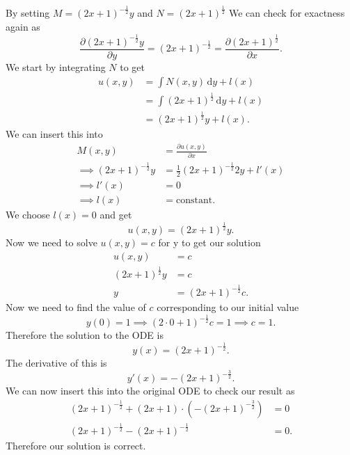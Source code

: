 By setting $M = \left( 2x+1 \right)^{-\frac{1}{2}}y$ and $N = \left( 2x+1 \right)^{\frac{1}{2}}$
We can check for exactness again as
\[ 
\frac{\partial (2x+1)^{-\frac{1}{2}}y}{\partial y} = (2x+1)^{-\frac{1}{2}} = \frac{\partial \left( 2x+1 \right)^{\frac{1}{2}}}{\partial x}
.\]
We start by integrating $N$ to get
\begin{align*}
  u(x,y) &= \int N(x,y) \, \mathrm{d}y + l(x) \\
  &= \int \left( 2x+1 \right)^{\frac{1}{2}} \, \mathrm{d}y + l(x) \\
  &= \left( 2x+1 \right)^{\frac{1}{2}}y + l(x)
.\end{align*}
We can insert this into
\begin{align*}
  M(x,y) &= \frac{\partial u(x,y)}{\partial x} \\
  \implies \left( 2x+1 \right)^{-\frac{1}{2}}y &= \frac{1}{2} \left( 2x+1 \right)^{-\frac{1}{2}}2y + l'(x) \\
  \implies l'(x) &= 0 \\
  \implies l(x) &= \mathrm{constant}
.\end{align*}
We choose $l(x) = 0$ and get
\[ 
u(x,y) = (2x+1)^{\frac{1}{2}}y
.\]
Now we need to solve $u(x,y) = c$ for y to get our solution
\begin{align*}
  u(x,y) &= c \\
  (2x+1)^{\frac{1}{2}}y  &= c \\
  y &= (2x+1)^{-\frac{1}{2}}c
.\end{align*}
Now we need to find the value of $c$ corresponding to our initial value
\[ 
y(0) = 1 \implies (2\cdot 0 + 1)^{-\frac{1}{2}}c = 1 \implies c = 1
.\]
Therefore the solution to the ODE is
\[ 
y(x) = (2x+1)^{-\frac{1}{2}}
.\]
The derivative of this is
\[ 
y'(x) = -(2x+1)^{-\frac{3}{2}}
.\]
We can now insert this into the original ODE to check our result as
\begin{align*}
  (2x+1)^{-\frac{1}{2}} + (2x+1) \cdot \left( -\left( 2x+1 \right)^{-\frac{3}{2}} \right) &= 0 \\
  (2x+1)^{-\frac{1}{2}} - \left( 2x+1 \right)^{-\frac{1}{2}} &= 0
.\end{align*}
Therefore our solution is correct.


